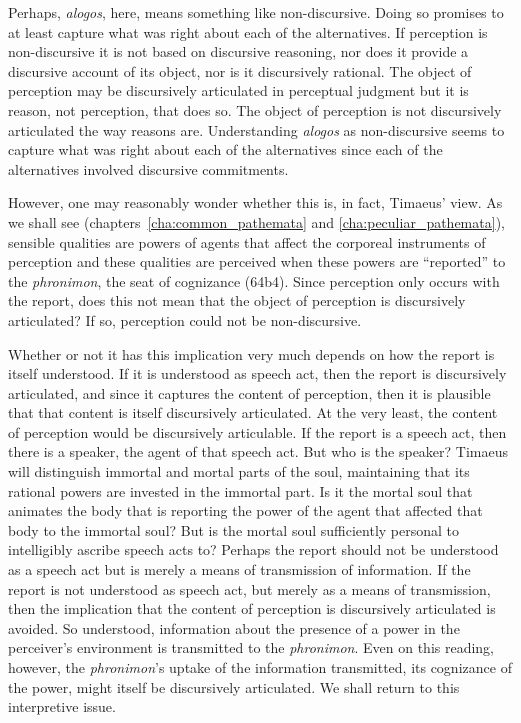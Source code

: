 Perhaps, \emph{alogos}, here, means something like non-discursive. Doing so pro\-mises to at least capture what was right about each of the alternatives. If perception is non-discursive it is not based on discursive reasoning, nor does it provide a discursive account of its object, nor is it discursively rational. The object of perception may be discursively articulated in perceptual judgment but it is reason, not perception, that does so. The object of perception is not discursively articulated the way reasons are. Understanding \emph{alogos} as non-discursive seems to capture what was right about each of the alternatives since each of the alternatives involved discursive commitments.

However, one may reasonably wonder whether this is, in fact, Timaeus' view. As we shall see (chapters~\ref{cha:common_pathemata} and \ref{cha:peculiar_pathemata}), sensible qualities are powers of agents that affect the corporeal instruments of perception and these qualities are perceived when these powers are ``reported'' to the \emph{phronimon}, the seat of cognizance (64b4). Since perception only occurs with the report, does this not mean that the object of perception is discursively articulated? If so, perception could not be non-discursive.

Whether or not it has this implication very much depends on how the report is itself understood. If it is understood as speech act, then the report is discursively articulated, and since it captures the content of perception, then it is plausible that that content is itself discursively articulated. At the very least, the content of perception would be discursively articulable. If the report is a speech act, then there is a speaker, the agent of that speech act. But who is the speaker? Timaeus will distinguish immortal and mortal parts of the soul, maintaining that its rational powers are invested in the immortal part. Is it the mortal soul that animates the body that is reporting the power of the agent that affected that body to the immortal soul? But is the mortal soul sufficiently personal to intelligibly ascribe speech acts to? Perhaps the report should not be understood as a speech act but is merely a means of transmission of information. If the report is not understood as speech act, but merely as a means of transmission, then the implication that the content of perception is discursively articulated is avoided. So understood, information about the presence of a power in the perceiver's environment is transmitted to the \emph{phronimon}. Even on this reading, however, the \emph{phronimon}'s uptake of the information transmitted, its cognizance of the power, might itself be discursively articulated. We shall return to this interpretive issue.


